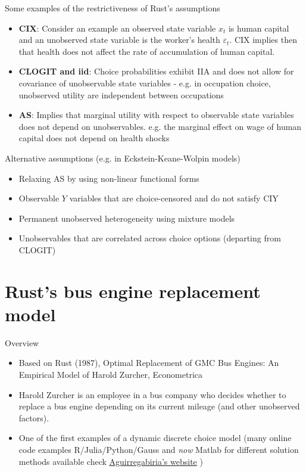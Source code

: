 \documentclass[aspectratio=169]{beamer}
\begin{document}
	\begin{frame}{Some examples of the restrictiveness of Rust's assumptions}
		\begin{itemize}
			\itemsep1em
			\item \textbf{CIX}: Consider an example an observed state variable $x_t$ is human capital and an unobserved state variable is the worker's health $\varepsilon_t$. CIX implies then that health does not affect the rate of accumulation of human capital.
			\item \textbf{CLOGIT and iid}: Choice probabilities exhibit IIA and does not allow for covariance of unobservable state variables - e.g. in occupation choice, unobserved utility are independent between occupations
			\item \textbf{AS}: Implies that marginal utility with respect to observable state variables does not depend on unobservables. e.g. the marginal effect on wage of human capital does not depend on health shocks
		\end{itemize}
	\end{frame}
	
	\begin{frame}{Alternative assumptions (e.g. in Eckstein-Keane-Wolpin models)}
		\begin{itemize}
			\itemsep1em
			\item Relaxing AS by using non-linear functional forms
			\item Observable $Y$ variables that are choice-censored and do not satisfy CIY
			\item Permanent unobserved heterogeneity using mixture models
			\item Unobservables that are correlated across choice options (departing from CLOGIT)
		\end{itemize}
	\end{frame}
	
	\section{Rust's bus engine replacement model}
	
	\begin{frame}{Overview}
		\begin{itemize}
			\itemsep1em
			\item Based on Rust (1987), Optimal Replacement of GMC Bus Engines: An Empirical Model of Harold Zurcher, Econometrica
			\item Harold Zurcher is an employee in a bus company who decides whether to replace a bus engine depending on its current mileage (and other unobserved factors).
			\item One of the first examples of a dynamic discrete choice model (many online code examples R/Julia/Python/Gauss and \textit{now} Matlab for different solution methods available \textemdash 
			check \href{https://sites.google.com/view/victoraguirregabiriaswebsite/computer-code\#h.7dcyjeogndqb}{Aguirregabiria's website} )
		\end{itemize}
	\end{frame}
	
\end{document}
